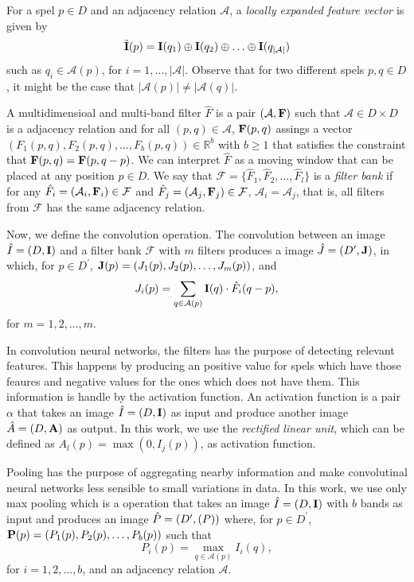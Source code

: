\documentclass[10pt,twocolumn,letterpaper]{article}
\newcommand{\R}{\mathbb{R}}
\newcommand{\A}{\mathcal{A}}
\newcommand{\I}{\hat{I}}
\newcommand{\m}[1]{{\mathrm{\bf #1}}}
\newcommand{\E}{\tilde{\m{I}}}
\newcommand{\F}{\hat{F}}
\newcommand{\lI}{\m{I}}
\newcommand{\mF}{\m{F}}
\newcommand{\bF}{\mathcal{F}}
\newcommand{\J}{\hat{J}}
\newcommand{\lJ}{\m{J}}
\newcommand{\pD}{D^\prime}
\begin{document}
For a spel $p \in D$ and an adjacency relation $\A$, a \textit{locally expanded feature vector} is given by \[\E(p) = \lI(q_1) \oplus \lI(q_2) \oplus \ldots \oplus \lI(q_{|\A|})\] such as $q_i \in \A(p)$, for $i = 1, \ldots, |\A|$. Observe that for two different spels $p, q \in D$, it might be the case that $|\A(p)| \neq |\A(q)|$.


A multidimensioal and multi-band filter $\F$ is a pair $(\A, \mF)$ such that $\A \in D \times D$ is a adjacency relation and for all $(p, q) \in \A$, $\mF(p, q)$ assings a vector $(F_1(p, q), F_2(p, q), \ldots, F_b(p, q)) \in \R^b$ with $b \ge 1$ that satisfies the constraint that $\mF(p, q) = \mF(p, q - p)$. We can interpret $\F$ as a moving window that can be placed at any position $p \in D$. We say that $\bF = \{\F_1, \F_2, \ldots, \F_l\}$ is a \textit{filter bank} if for any $\F_i = (\A_i, \mF_i) \in \bF$ and $\F_j = (\A_j, \mF_j) \in \bF$, $\A_i = \A_j$, that is, all filters from $\bF$ has the same adjacency relation.

Now, we define the convolution operation. The convolution between an image $\I = (D, \lI)$ and a filter bank $\bF$ with $m$ filters produces a image $\J = (\pD, \lJ)$, in which, for $p \in \pD$, $\lJ(p) = (J_1(p), J_2(p), \ldots, J_m(p))$, and \[J_i(p) = \sum_{q \in \A(p)}\lI(q) \cdot {\F_i(q - p)},\] for $m = 1, 2,  \ldots, m$.

In convolution neural networks, the filters has the purpose of detecting relevant features. This happens by producing an positive value for spels which have those feaures and negative values for the ones which does not have them. This information is handle by the activation function. An activation function is a pair $\alpha$ that takes an image $\I = (D, \lI)$ as input and produce another image $\hat{A} = (D, \m{A})$ as output.  In this work, we use the \textit{rectified linear unit}, which can be defined as $A_l(p) = \max(0, I_j(p))$, as activation function.

Pooling has the purpose of aggregating nearby information and make convolutinal neural networks less sensible to small variations in data. In this work, we use only max pooling which is a operation that takes an image $\I = (D, \lI)$ with $b$ bands as input and produces an image $\hat{P} = (\pD, \m(P))$ where, for $p \in \pD$, ${\m{P}} (p) = (P_1(p), P_2(p), \ldots, P_b(p))$ such that \[P_i(p) = \max_{q \in \A(p)}{I_i(q)},\] for $i = 1, 2, \ldots, b$, and an adjacency relation $\A$.
\end{document}

